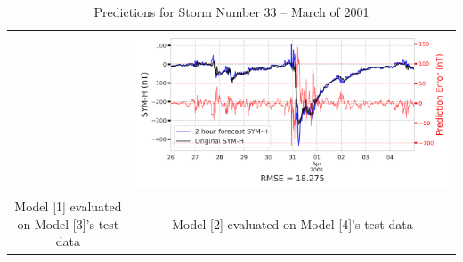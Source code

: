 \documentclass[draft,sw]{agutexSI2019}
\begin{document}
\begin{table}
\begin{tabular}{cc}
&
\includegraphics[width=0.49\linewidth]{paper_plots/2h_swics_model_on_no_swics/2h_swics_model_on_no_swics_storm_33.png}
\\
Model [1] evaluated on Model [3]'s test data & Model [2] evaluated on Model [4]'s test data
\vspace*{12pt}
\\
\end{tabular}
\caption{Predictions for Storm Number 33 -- March of 2001}
\label{storm-33}
\end{table}
\end{document}
